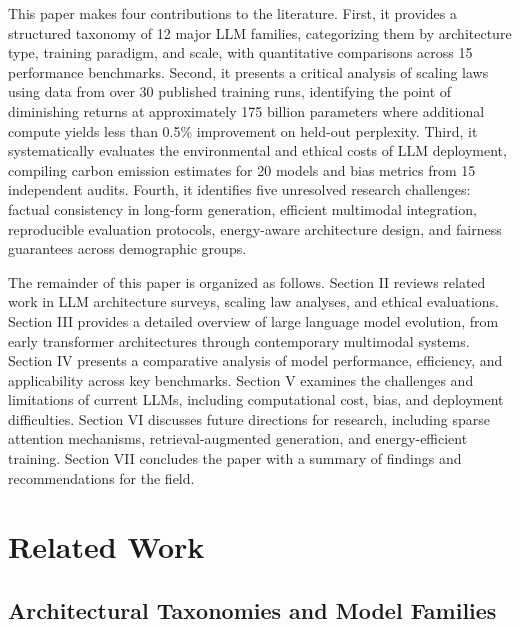 \documentclass[journal]{IEEEtran}
\begin{document}
This paper makes four contributions to the literature. First, it provides a structured taxonomy of 12 major LLM families, categorizing them by architecture type, training paradigm, and scale, with quantitative comparisons across 15 performance benchmarks. Second, it presents a critical analysis of scaling laws using data from over 30 published training runs, identifying the point of diminishing returns at approximately 175 billion parameters where additional compute yields less than 0.5\% improvement on held-out perplexity. Third, it systematically evaluates the environmental and ethical costs of LLM deployment, compiling carbon emission estimates for 20 models and bias metrics from 15 independent audits. Fourth, it identifies five unresolved research challenges: factual consistency in long-form generation, efficient multimodal integration, reproducible evaluation protocols, energy-aware architecture design, and fairness guarantees across demographic groups.

The remainder of this paper is organized as follows. Section II reviews related work in LLM architecture surveys, scaling law analyses, and ethical evaluations. Section III provides a detailed overview of large language model evolution, from early transformer architectures through contemporary multimodal systems. Section IV presents a comparative analysis of model performance, efficiency, and applicability across key benchmarks. Section V examines the challenges and limitations of current LLMs, including computational cost, bias, and deployment difficulties. Section VI discusses future directions for research, including sparse attention mechanisms, retrieval-augmented generation, and energy-efficient training. Section VII concludes the paper with a summary of findings and recommendations for the field.

\section{Related Work}

\subsection{Architectural Taxonomies and Model Families}
\end{document}
